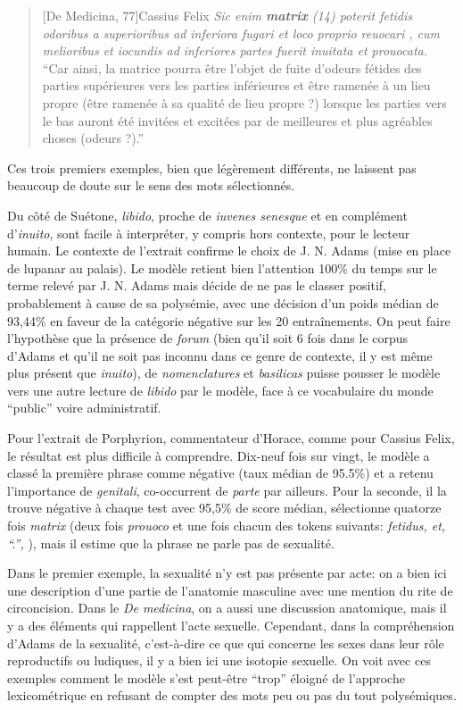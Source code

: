 \begin{quote}[De Medicina, 77]{Cassius Felix}
    \textit{Sic enim \textbf{matrix} (14) poterit fetidis odoribus a superioribus ad inferiora fugari et loco proprio reuocari , cum melioribus et iocundis ad inferiores partes fuerit inuitata et prouocata.} \\
    \enquote{Car ainsi, la matrice pourra être l'objet de fuite d'odeurs fétides des parties supérieures vers les parties inférieures et être ramenée à un lieu propre (être ramenée à sa qualité de lieu propre ?) lorsque les parties vers le bas auront été invitées et excitées par de meilleures et plus agréables choses (odeurs ?).}
\end{quote}

Ces trois premiers exemples, bien que légèrement différents, ne laissent pas beaucoup de doute sur le sens des mots sélectionnés. 

Du côté de Suétone, \textit{libido}, proche de \textit{iuvenes senesque} et en complément d'\textit{inuito}, sont facile à interpréter, y compris hors contexte, pour le lecteur humain. Le contexte de l'extrait confirme le choix de J. N. Adams (mise en place de lupanar au palais). Le modèle retient bien l'attention 100\% du temps sur le terme relevé par J. N. Adams mais décide de ne pas le classer positif, probablement à cause de sa polysémie, avec une décision d'un poids médian de 93,44\% en faveur de la catégorie négative sur les 20 entraînements. On peut faire l'hypothèse que la présence de \textit{forum} (bien qu'il soit 6 fois dans le corpus d'Adams et qu'il ne soit pas inconnu dans ce genre de contexte, il y est même plus présent que \textit{inuito}), de \textit{nomenclatures} et \textit{basilicas} puisse pousser le modèle vers une autre lecture de \textit{libido} par le modèle, face à ce vocabulaire du monde ``public'' voire administratif.

Pour l'extrait de Porphyrion, commentateur d'Horace, comme pour Cassius Felix, le résultat est plus difficile à comprendre. Dix-neuf fois sur vingt, le modèle a classé la première phrase comme négative  (taux médian de 95.5\%) et a retenu l'importance de \textit{genitali}, co-occurrent de \textit{parte} par ailleurs. Pour la seconde, il la trouve négative à chaque test avec 95,5\% de score médian, sélectionne quatorze fois \textit{matrix} (deux fois \textit{prouoco} et une fois chacun des tokens suivants: \textit{fetidus, et, ``.'', }), mais il estime que la phrase ne parle pas de sexualité.

Dans le premier exemple, la sexualité n'y est pas présente par acte: on a bien ici une description d'une partie de l'anatomie masculine avec une mention du rite de circoncision. Dans le \textit{De medicina}, on a aussi une discussion anatomique, mais il y a des éléments qui rappellent l'acte sexuelle. Cependant, dans la compréhension d'Adams de la sexualité, c'est-à-dire ce que qui concerne les sexes dans leur rôle reproductifs ou ludiques, il y a bien ici une isotopie sexuelle. On voit avec ces exemples comment le modèle s'est peut-être ``trop'' éloigné de l'approche lexicométrique en refusant de compter des mots peu ou pas du tout polysémiques.

